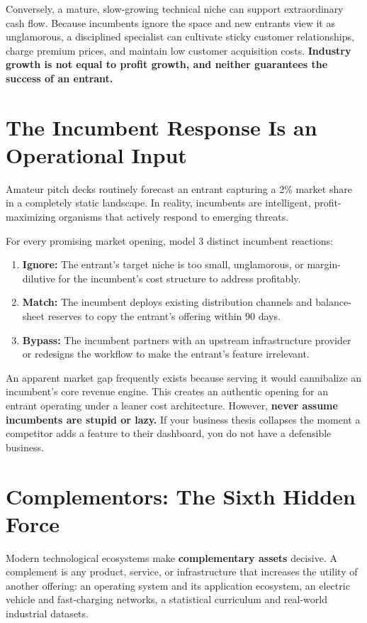 Conversely, a mature, slow-growing technical niche can support extraordinary cash flow. Because incumbents ignore the space and new entrants view it as unglamorous, a disciplined specialist can cultivate sticky customer relationships, charge premium prices, and maintain low customer acquisition costs. \textbf{Industry growth is not equal to profit growth, and neither guarantees the success of an entrant.}

\section{The Incumbent Response Is an Operational Input}

Amateur pitch decks routinely forecast an entrant capturing a 2\% market share in a completely static landscape. In reality, incumbents are intelligent, profit-maximizing organisms that actively respond to emerging threats.

For every promising market opening, model 3 distinct incumbent reactions:
\begin{enumerate}[leftmargin=12pt,itemsep=2pt,topsep=1pt,parsep=0pt]
  \item \textbf{Ignore:} The entrant's target niche is too small, unglamorous, or margin-dilutive for the incumbent's cost structure to address profitably.
  \item \textbf{Match:} The incumbent deploys existing distribution channels and balance-sheet reserves to copy the entrant's offering within 90 days.
  \item \textbf{Bypass:} The incumbent partners with an upstream infrastructure provider or redesigns the workflow to make the entrant's feature irrelevant.
\end{enumerate}

An apparent market gap frequently exists because serving it would cannibalize an incumbent's core revenue engine. This creates an authentic opening for an entrant operating under a leaner cost architecture. However, \textbf{never assume incumbents are stupid or lazy.} If your business thesis collapses the moment a competitor adds a feature to their dashboard, you do not have a defensible business.

\section{Complementors: The Sixth Hidden Force}

Modern technological ecosystems make \textbf{complementary assets} decisive. A complement is any product, service, or infrastructure that increases the utility of another offering: an operating system and its application ecosystem, an electric vehicle and fast-charging networks, a statistical curriculum and real-world industrial datasets.

